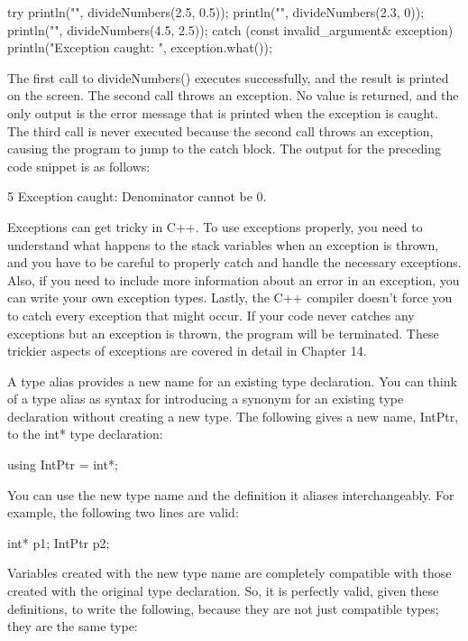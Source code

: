 \begin{cpp}
try {
    println("{}", divideNumbers(2.5, 0.5));
    println("{}", divideNumbers(2.3, 0));
    println("{}", divideNumbers(4.5, 2.5));
} catch (const invalid_argument& exception) {
    println("Exception caught: {}", exception.what());
}
\end{cpp}

The first call to divideNumbers() executes successfully, and the result is printed on the screen. The second call throws an exception. No value is returned, and the only output is the error message that is printed when the exception is caught. The third call is never executed because the second call throws an exception, causing the program to jump to the catch block. The output for the preceding code snippet is as follows:

\begin{shell}
5
Exception caught: Denominator cannot be 0.
\end{shell}

Exceptions can get tricky in C++. To use exceptions properly, you need to understand what happens to the stack variables when an exception is thrown, and you have to be careful to properly catch and handle the necessary exceptions. Also, if you need to include more information about an error in an exception, you can write your own exception types. Lastly, the C++ compiler doesn’t force you to catch every exception that might occur. If your code never catches any exceptions but an exception is thrown, the program will be terminated. These trickier aspects of exceptions are covered in detail in Chapter 14.


A type alias provides a new name for an existing type declaration. You can think of a type alias as syntax for introducing a synonym for an existing type declaration without creating a new type. The following gives a new name, IntPtr, to the int* type declaration:

\begin{cpp}
using IntPtr = int*;
\end{cpp}

You can use the new type name and the definition it aliases interchangeably. For example, the following two lines are valid:

\begin{cpp}
int* p1;
IntPtr p2;
\end{cpp}

Variables created with the new type name are completely compatible with those created with the original type declaration. So, it is perfectly valid, given these definitions, to write the following, because they are not just compatible types; they are the same type:

